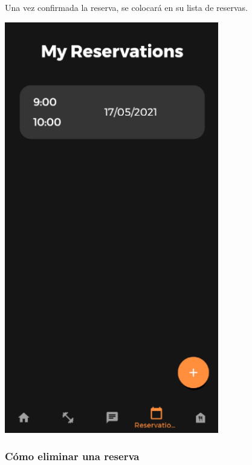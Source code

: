 \documentclass[12pt,a4paper]{article}
\begin{document}
\begin{enumerate}
\begin{minipage}{.60\textwidth}
  \item Una vez confirmada la reserva, se colocará en su lista de reservas.
\end{minipage}
\begin{minipage}{.40\textwidth}
  \includegraphics[width=0.7\textwidth, right]{misreservas}
\end{minipage}

\end{enumerate}


\subsubsection{Cómo eliminar una reserva}
\end{document}
